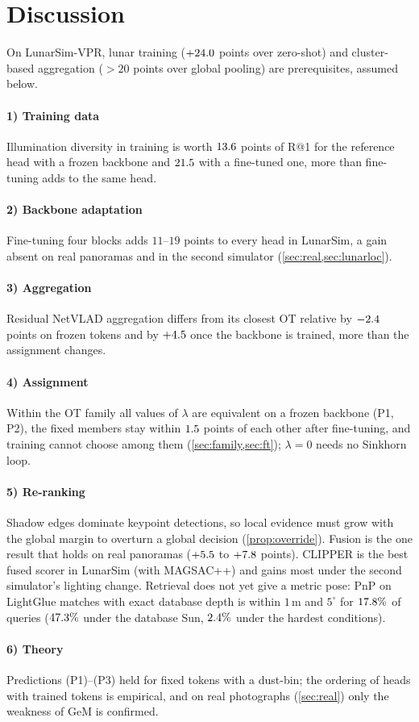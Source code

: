 \section{Discussion}\label{sec:discussion}
On LunarSim-VPR, lunar training ($+24.0$ points over zero-shot) and cluster-based aggregation
($>20$ points over global pooling) are prerequisites, assumed below.

\paragraph*{1) Training data}
Illumination diversity in training is worth $13.6$ points of R@1 for the reference head with a
frozen backbone and $21.5$ with a fine-tuned one, more than fine-tuning adds to the same head.

\paragraph*{2) Backbone adaptation}
Fine-tuning four blocks adds $11$--$19$ points to every head in LunarSim, a gain absent on real panoramas and
in the second simulator (\cref{sec:real,sec:lunarloc}).

\paragraph*{3) Aggregation}
Residual NetVLAD aggregation differs from its closest OT relative by $-2.4$ points on frozen
tokens and by $+4.5$ once the backbone is trained, more than the assignment changes.

\paragraph*{4) Assignment}
Within the OT family all values of $\lambda$ are equivalent on a frozen backbone (P1, P2), the fixed members
stay within $1.5$ points of each other after fine-tuning, and training cannot choose among them
(\cref{sec:family,sec:ft}); $\lambda=0$ needs no Sinkhorn loop.

\paragraph*{5) Re-ranking}
Shadow edges dominate keypoint detections, so local evidence must grow with the global margin to
overturn a global decision (\cref{prop:override}). Fusion is the one result that holds on real panoramas ($+5.5$ to $+7.8$ points). CLIPPER is the
best fused scorer in LunarSim (with MAGSAC++) and gains most under the second simulator's lighting change. Retrieval does not yet give a metric pose: PnP on LightGlue
matches with exact database depth is within $1$\,m and $5^\circ$ for $17.8\%$ of queries
($47.3\%$ under the database Sun, $2.4\%$ under the hardest conditions).

\paragraph*{6) Theory}
Predictions (P1)--(P3) held for fixed tokens with a dust-bin; the ordering of heads with trained tokens is
empirical, and on real photographs (\cref{sec:real}) only the weakness of GeM is confirmed.
